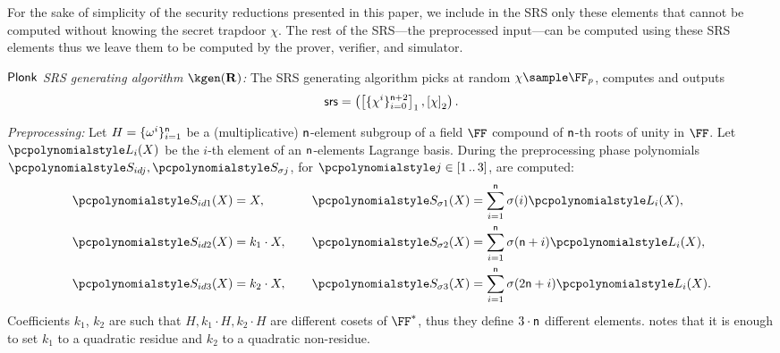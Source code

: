 \documentclass[runningheads,11pt]{llncs}
\newcommand{\ourpar}[1] {\smallskip\noindent\emph{#1}}
\begin{document}
For the sake of simplicity of the security reductions presented in this paper, we
include in the SRS only these elements that cannot be computed without knowing
the secret trapdoor $\chi$. The rest of the SRS---the preprocessed input---can
be computed using these SRS elements thus we leave them to be computed by the
prover, verifier, and simulator.

\ourpar{$\textnormal{\textsf{Plonk}}$ SRS generating algorithm $\kgen(\REL)$:}
The SRS generating algorithm picks at random $\chi \sample \FF_p$, computes
and outputs
\[
	\mathsf{srs} = \left(\left[\{\chi^i\}_{i = 0}^{\mathsf{n} + 2}\right]_{1},
	\left[\chi\right]_{2} \right).
\]

\ourpar{Preprocessing:}
Let $H = \{\omega^i\}_{i = 1}^{\mathsf{n} }$ be a
(multiplicative) $\mathsf{n}$-element subgroup of a field $\FF$
compound of $\mathsf{n}$-th roots of unity in $\FF$. Let $\lag_i(X)$ be
the $i$-th element of an $\mathsf{n}$-elements Lagrange basis. During
the preprocessing phase polynomials $\p{S_{id j}}, \p{S_{\sigma j}}$, for
$\p{j} \in \range{1}{3}$, are computed:
\begin{equation*}
  \begin{aligned}
    \p{S_{id 1}}(X) & = X,\vphantom{\sum_{i = 1}^{\noofc} \sigma(i) \lag_i(X),}\\
    \p{S_{id 2}}(X) & = k_1 \cdot X,\vphantom{\sum_{i = 1}^{\noofc} \sigma(i) \lag_i(X),}\\
    \p{S_{id 3}}(X) & = k_2 \cdot X,\vphantom{\sum_{i = 1}^{\noofc} \sigma(i) \lag_i(X),}
  \end{aligned}
  \qquad
\begin{aligned}
  \p{S_{\sigma 1}}(X) & = \sum_{i = 1}^{\noofc} \sigma(i) \lag_i(X),\\
  \p{S_{\sigma 2}}(X) & = \sum_{i = 1}^{\noofc}
  \sigma(\noofc + i) \lag_i(X),\\
  \p{S_{\sigma 3}}(X) & =\sum_{i = 1}^{\noofc} \sigma(2 \noofc + i) \lag_i(X).
\end{aligned}
\end{equation*}
Coefficients $k_1$, $k_2$ are such that $H, k_1 \cdot H, k_2 \cdot H$ are
different cosets of $\FF^*$, thus they define $3 \cdot \mathsf{n}$
different elements. \cite{EPRINT:GabWilCio19} notes that it is enough to set
$k_1$ to a quadratic residue and $k_2$ to a quadratic non-residue.
\end{document}
